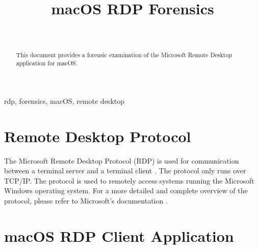\documentclass[journal]{IEEEtran}
\begin{document}
\title{macOS RDP Forensics}

\author{\\
}

\onecolumn
\maketitle
\thispagestyle{empty}

\tableofcontents
\twocolumn
{}

\begin{abstract}
This document provides a forensic examination of the Microsoft Remote Desktop application for macOS.
\end{abstract}

\begin{IEEEkeywords}
rdp, forensics, macOS, remote desktop
\end{IEEEkeywords}

\section{Remote Desktop Protocol}

The Microsoft Remote Desktop Protocol (RDP) is used for communication between a terminal server and a terminal client \cite{deland-han_understanding_nodate}. The protocol only runs over TCP/IP. The protocol is used to remotely access systems running the Microsoft Windows operating system. For a more detailed and complete overview of the protocol, please refer to Microsoft’s documentation \cite{openspecs-office_ms-rdpbcgr_nodate}. 

\section{macOS RDP Client Application}
\end{document}
